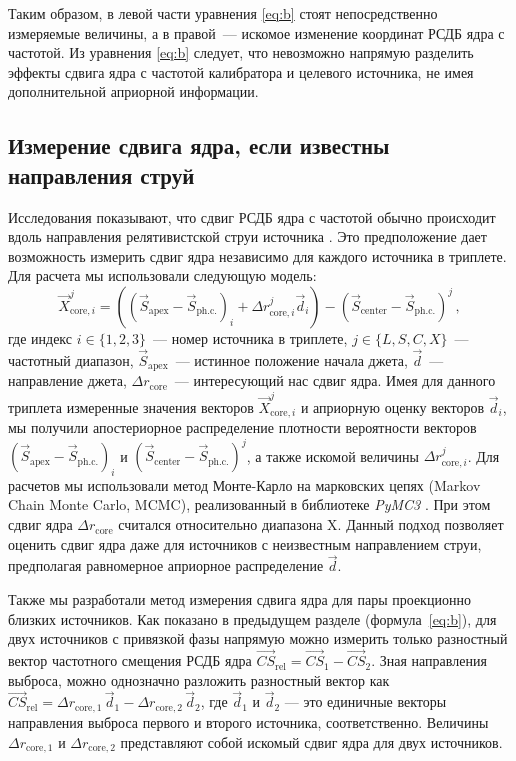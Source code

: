 Таким образом, в левой части уравнения \eqref{eq:b} стоят непосредственно измеряемые величины, а в
правой~--- искомое изменение координат РСДБ ядра с частотой. Из уравнения \eqref{eq:b} следует, что
невозможно напрямую разделить эффекты сдвига ядра с частотой калибратора и целевого источника, не
имея дополнительной априорной информации.


\subsection{Измерение сдвига ядра, если известны направления струй}
\label{s:method_astrometry}
Исследования показывают, что сдвиг РСДБ ядра с частотой обычно происходит вдоль направления
релятивистской струи источника \cite{Pushkarev_2012}. Это предположение дает возможность
измерить сдвиг ядра независимо для каждого источника в триплете. Для расчета мы использовали
следующую модель:
\[
\vec{X}_{\text{core}, i}^{j} = ((\vec{S}_\text{apex} - \vec{S}_\text{ph.c.})_i +
\Delta r_{\text{core},i}^{j} \vec{d}_i) - (\vec{S}_\text{center} -
\vec{S}_\text{ph.c.})^j \,,
\]
где индекс $i \in \{1,2,3\}$~--- номер источника в триплете, $j \in \{L,S,C,X\}$~---
частотный диапазон, $\vec{S}_\text{apex}$~--- истинное положение начала джета, $\vec{d}$~---
направление джета, $\Delta r_\text{core}$~--- интересующий нас сдвиг ядра. Имея для данного
триплета измеренные значения векторов $\vec{X}_{\text{core}, i}^{j}$ и априорную оценку векторов
$\vec{d}_i$, мы получили апостериорное распределение плотности вероятности векторов
$(\vec{S}_\text{apex} - \vec{S}_\text{ph.c.})_i$ и $(\vec{S}_\text{center} -
\vec{S}_\text{ph.c.})^j$, а также искомой величины $\Delta r_{\text{core},i}^{j}$. Для
расчетов мы использовали метод Монте-Карло на марковских цепях (Markov Chain Monte Carlo, MCMC),
реализованный в библиотеке \emph{PyMC3} \cite{Salvatier_2016}. При этом сдвиг ядра $\Delta
r_{\text{core}}$ считался относительно диапазона X. Данный подход позволяет оценить сдвиг ядра
даже для источников с неизвестным направлением струи, предполагая равномерное априорное
распределение $\vec{d}$.

Также мы разработали метод измерения сдвига ядра для пары проекционно близких источников. Как
показано в предыдущем разделе (формула~\ref{eq:b}), для двух источников с привязкой фазы напрямую
можно измерить только
разностный вектор частотного смещения РСДБ ядра $\vec{CS}_{\text{rel}} = \vec{CS}_1 -
\vec{CS}_2$. Зная направления выброса, можно однозначно разложить разностный вектор как
$\vec{CS}_{\text{rel}} = \Delta r_{\text{core},1} \, \vec{d}_1 - \Delta
r_{\text{core},2} \, \vec{d}_2$, где $\vec{d}_1$ и $\vec{d}_2$ --- это единичные векторы
направления выброса первого и второго источника, соответственно. Величины $\Delta
r_{\text{core},1}$ и $\Delta r_{\text{core},2}$ представляют собой искомый сдвиг ядра для двух
источников.

